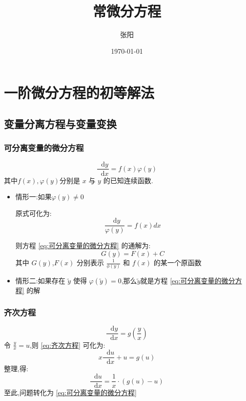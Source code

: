\documentclass{ctexart}
\author{张阳}
\date{\today}
\title{常微分方程}
\newcommand*{\dif}{\mathop{}\!\mathrm{d}}
\numberwithin{equation}{subsection}
\begin{document}
\maketitle
\tableofcontents
\newpage
\section{一阶微分方程的初等解法}
\subsection{变量分离方程与变量变换}
\subsubsection{可分离变量的微分方程}
   \begin{equation}
        \label{eq:可分离变量的微分方程}
    \frac{{\dif y}}{{\dif x}} = f(x)\varphi(y)
   \end{equation}
   其中$f(x),\varphi (y)$分别是 $x$ 与 $y$ 的已知连续函数.
\begin{itemize}
\item 情形一:如果${\varphi (y) \ne 0}$
            
 原式可化为:
$$\frac{{\dif y}}{{\varphi (y)}} = f(x)dx$$

则方程 \eqref{eq:可分离变量的微分方程} 的通解为:
\[G(y)=F(x)+C\]
其中 $G(y)$,$F(x)$ 分别表示 $\frac{1}{{\phi (y)}}$ 和 $f(x)$ 的某一个原函数
\item 情形二:如果存在 ${\widetilde{y}}$ 使得 ${\varphi (\widetilde{y}) = 0}$,那么${\widetilde{y}}$就是方程 \eqref{eq:可分离变量的微分方程} 的解
\end{itemize}
\subsubsection{齐次方程}
\begin{equation}
        \label{eq:齐次方程}
        \frac{{\dif y}}{{\dif x}} = g(\frac{y}{x})
    \end{equation}
令 $\frac{y}{x} = u$,则 \eqref{eq:齐次方程} 可化为:
\[x\frac{\dif u}{{\dif x}} + u = g(u)\]
整理,得:
\[\frac{{\dif u}}{{\dif x}} = \frac{1}{x} \cdot (g(u) - u)\]
至此,问题转化为 \eqref{eq:可分离变量的微分方程}
\end{document}
